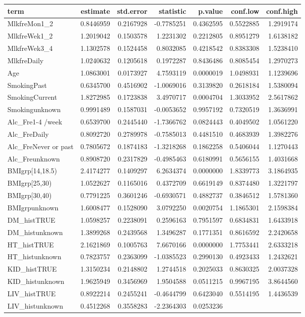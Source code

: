 \documentclass[]{article}
\begin{document}
\begin{longtable}[]{@{}lrrrrrr@{}}
\toprule
term & estimate & std.error & statistic & p.value & conf.low &
conf.high\tabularnewline
\midrule
\endhead
MlkfreMon1\_2 & 0.8446959 & 0.2167928 & -0.7785251 & 0.4362595 &
0.5522885 & 1.2919174\tabularnewline
MlkfreWek1\_2 & 1.2019042 & 0.1503578 & 1.2231302 & 0.2212805 &
0.8951279 & 1.6138182\tabularnewline
MlkfreWek3\_4 & 1.1302578 & 0.1524458 & 0.8032085 & 0.4218542 &
0.8383308 & 1.5238410\tabularnewline
MlkfreDaily & 1.0240632 & 0.1205618 & 0.1972287 & 0.8436486 & 0.8085454
& 1.2970273\tabularnewline
Age & 1.0863001 & 0.0173927 & 4.7593119 & 0.0000019 & 1.0498931 &
1.1239696\tabularnewline
SmokingPast & 0.6345700 & 0.4516902 & -1.0069016 & 0.3139820 & 0.2618184
& 1.5380094\tabularnewline
SmokingCurrent & 1.8272985 & 0.1723838 & 3.4970717 & 0.0004704 &
1.3033952 & 2.5617862\tabularnewline
Smokingunknown & 0.9991489 & 0.1587031 & -0.0053652 & 0.9957192 &
0.7320519 & 1.3636991\tabularnewline
Alc\_Fre1-4 /week & 0.6539700 & 0.2445440 & -1.7366762 & 0.0824443 &
0.4049502 & 1.0561220\tabularnewline
Alc\_FreDaily & 0.8092720 & 0.2789978 & -0.7585013 & 0.4481510 &
0.4683939 & 1.3982276\tabularnewline
Alc\_FreNever or past & 0.7805672 & 0.1874183 & -1.3218268 & 0.1862258 &
0.5406044 & 1.1270443\tabularnewline
Alc\_Freunknown & 0.8908720 & 0.2317829 & -0.4985463 & 0.6180991 &
0.5656155 & 1.4031668\tabularnewline
BMIgrp{[}14,18.5) & 2.4174277 & 0.1409297 & 6.2634374 & 0.0000000 &
1.8339773 & 3.1864935\tabularnewline
BMIgrp{[}25,30) & 1.0522627 & 0.1165016 & 0.4372709 & 0.6619149 &
0.8374480 & 1.3221797\tabularnewline
BMIgrp{[}30,40) & 0.7791225 & 0.3601246 & -0.6930571 & 0.4882737 &
0.3846512 & 1.5781360\tabularnewline
BMIgrpunknown & 1.6008477 & 0.1528090 & 3.0792250 & 0.0020754 &
1.1865301 & 2.1598384\tabularnewline
DM\_histTRUE & 1.0598257 & 0.2238091 & 0.2596163 & 0.7951597 & 0.6834831
& 1.6433918\tabularnewline
DM\_histunknown & 1.3899268 & 0.2439568 & 1.3496287 & 0.1771351 &
0.8616592 & 2.2420658\tabularnewline
HT\_histTRUE & 2.1621869 & 0.1005763 & 7.6670166 & 0.0000000 & 1.7753441
& 2.6333218\tabularnewline
HT\_histunknown & 0.7823757 & 0.2363099 & -1.0385523 & 0.2990130 &
0.4923433 & 1.2432621\tabularnewline
KID\_histTRUE & 1.3150234 & 0.2148802 & 1.2744518 & 0.2025033 &
0.8630325 & 2.0037328\tabularnewline
KID\_histunknown & 1.9625949 & 0.3456969 & 1.9504588 & 0.0511215 &
0.9967195 & 3.8644560\tabularnewline
LIV\_histTRUE & 0.8922214 & 0.2455241 & -0.4644799 & 0.6423040 &
0.5514195 & 1.4436539\tabularnewline
LIV\_histunknown & 0.4512268 & 0.3558283 & -2.2364303 & 0.0253236 &

\end{longtable}
\end{document}
